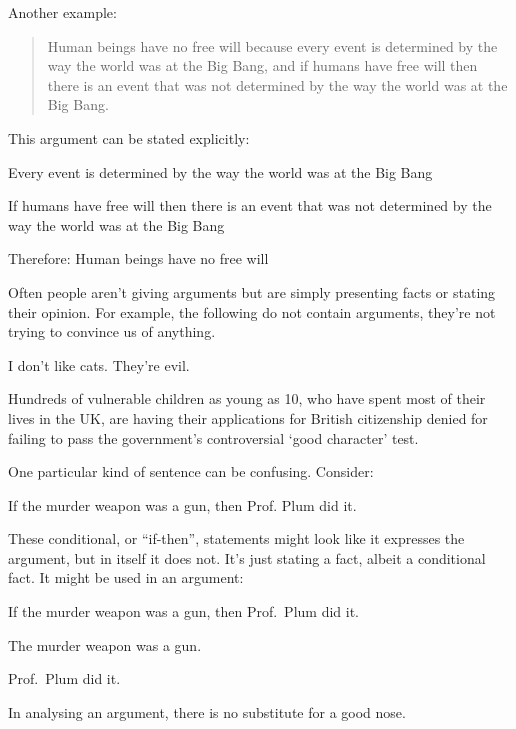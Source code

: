 Another example:
\begin{quote}
Human beings have no free will because every event is
determined by the way the world was at the Big Bang,
and if humans have free will then there is an event that
was not determined by the way the world was at the Big
Bang.
\end{quote}
This argument can be stated explicitly:
\begin{earg}
\item Every event is determined by the way the world was at the Big
Bang
\item If humans have free will then there is an event that was not
determined by the way the world was at the Big Bang
\item Therefore: Human beings have no free will
\end{earg}

Often people aren't giving arguments but are simply presenting facts or stating their opinion.
For example, the following do not contain arguments, they're not trying to convince us of anything. 
\begin{ebullet}
\item I don't like cats. They're evil.
\item Hundreds of vulnerable children as young as 10, who have spent most of their lives in the UK, are having their applications for British citizenship denied for failing to pass the government's controversial `good character' test.
\end{ebullet}
One particular kind of sentence can be confusing. Consider: 
\begin{ebullet}
\item  If the murder weapon was a gun, then Prof. Plum did it.
\end{ebullet}These conditional, or ``if-then'', statements might look like it expresses the argument, but in itself it does not. It's just stating a fact, albeit a conditional fact. It might be used in an argument:
\begin{earg}
\item If the murder weapon was a gun, then Prof.~Plum did it.
\item The murder weapon was a gun.
\item[\therefore] Prof.~Plum did it.
\end{earg}

In analysing an argument, there is no substitute for a good nose. 


